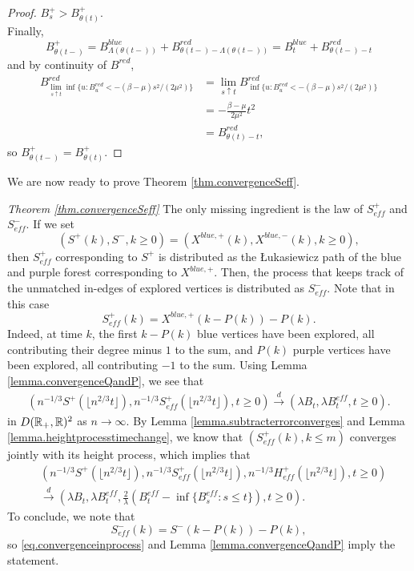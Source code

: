 \begin{proof}
$B^+_s>B^+_{\theta(t)}$. \\
Finally, 
$$B^+_{\theta(t-)}=B^{blue}_{\Lambda(\theta(t-))}+B^{red}_{\theta(t-)-\Lambda(\theta(t-))}
=B^{blue}_{t}+B^{red}_{\theta(t-)-t}$$
and by continuity of $B^{red}$,
\begin{align*}B^{red}_{\lim_{s\uparrow t}\inf\{u:B^{red}_u<-(\beta-\mu)s^2/(2\mu^2)\}}&=\lim_{s\uparrow t} B^{red}_{\inf\{u:B^{red}_u<-(\beta-\mu)s^2/(2\mu^2)\}}\\&= -\frac{\beta-\mu}{2\mu^2}t^2\\
&=B^{red}_{\theta(t)-t}, \end{align*}
so 
$B^+_{\theta(t-)}=B^+_{\theta(t)}.$
\end{proof}

We are now ready to prove Theorem \ref{thm.convergenceSeff}.

\begin{proofof}{\emph{Theorem \ref{thm.convergenceSeff}}}
The only missing ingredient is the law of $S^+_{eff}$ and $S^-_{eff}$. If we set $$(S^+(k),S^-,k\geq 0) =(X^{blue,+}(k),X^{blue,-}(k),k\geq 0),$$
then $S^+_{eff}$ corresponding to $S^+$ is distributed as the \L ukasiewicz path of the blue and purple forest corresponding to $X^{blue,+}$. Then, the process that keeps track of the unmatched in-edges of explored vertices is distributed as $S^-_{eff}$. 
Note that in this case 
$$S^+_{eff}(k)=X^{blue,+}(k-P(k))-P(k).$$
Indeed, at time $k$, the first $k-P(k)$ blue vertices have been explored, all contributing their degree minus $1$ to the sum, and $P(k)$ purple vertices have been explored, all contributing $-1$ to the sum. Using Lemma \ref{lemma.convergenceQandP}, we see that 
\begin{align*}
    \left(n^{-1/3}S^+\left(\lfloor n^{2/3}t\rfloor\right), n^{-1/3}S^+_{eff}\left(\lfloor n^{2/3}t\rfloor\right), t\geq 0\right)\overset{d}{\to}\left(\lambda B_t, \lambda B^{eff}_t, t\geq 0\right).
\end{align*}
in $D({\mathbb R}_+,{\mathbb R})^2$ as $n\to \infty$. 
By Lemma \ref{lemma.subtracterrorconverges} and Lemma \ref{lemma.heightprocesstimechange}, we know that $(S^+_{eff}(k),k\leq m)$ converges jointly with its height process, which implies that 
\begin{align*}
    &\left(n^{-1/3}S^+\left(\lfloor n^{2/3}t\rfloor\right), n^{-1/3}S^+_{eff}\left(\lfloor n^{2/3}t\rfloor\right),n^{-1/3}H^+_{eff}\left(\lfloor n^{2/3}t\rfloor\right), t\geq 0\right)\\
    &\overset{d}{\to}\left(\lambda B_t, \lambda B^{eff}_t,  \frac{2}{\lambda}\left(B^{eff}_{t}-\inf\{B^{eff}_{s}:s\leq t\}\right), t\geq 0\right).
\end{align*}
To conclude, we note that 
$$S^-_{eff}(k)=S^-(k-P(k))-P(k),$$
so \eqref{eq.convergenceinprocess} and Lemma \ref{lemma.convergenceQandP} imply the statement. 

\end{proofof}

